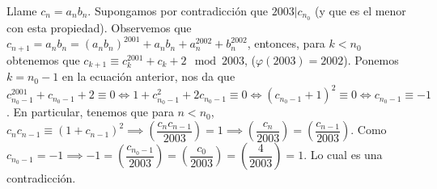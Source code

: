 \begin{sol}
	Llame $c_{n} = a_{n}b_{n}$. Supongamos por contradicci\'on que $2003|c_{n_{0}}$ (y que es el menor con esta propiedad). Observemos que $c_{n+1} = a_{n}b_{n} = \left(a_{n}b_{n}\right)^{2001} + a_{n}b_{n} + a_{n}^{2002}+b_{n}^{2002}$, entonces, para $k<n_{0}$ obtenemos que $c_{k+1} \equiv c_{k}^{2001}+c_{k} +2 \mod 2003$, ($\varphi(2003) = 2002$). Ponemos $k = n_{0}-1$ en la ecuaci\'on anterior, nos da que $c_{n_{0}-1}^{2001} +c_{n_{0}-1} + 2 \equiv 0 \iff 1+c_{n_{0}-1}^{2} + 2c_{n_{0}-1} \equiv 0 \iff (c_{n_{0}-1}+1)^{2} \equiv 0 \iff c_{n_{0}-1} \equiv -1$. En particular, tenemos que para $n< n_{0}$, $c_{n}c_{n-1} \equiv \left(1+c_{n-1}\right)^{2} \implies \left(\dfrac{c_{n}c_{n-1}}{2003}\right) = 1 \implies \left(\dfrac{c_{n}}{2003}\right) = \left(\dfrac{c_{n-1}}{2003}\right)$. Como $c_{n_{0}-1} = -1 \implies -1 = \left(\dfrac{c_{n_{0}-1}}{2003}\right) = \left(\dfrac{c_{0}}{2003}\right) = \left(\dfrac{4}{2003}\right) = 1$. Lo cual es una contradicci\'on.
\end{sol}